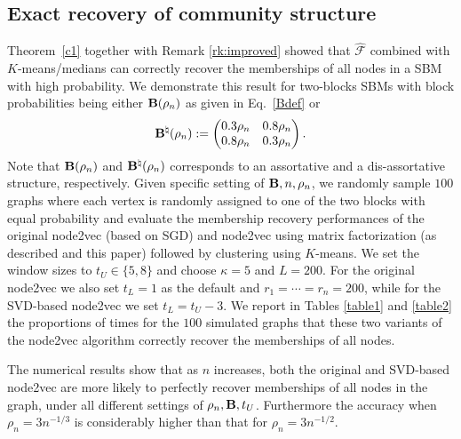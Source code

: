 \documentclass[10pt,journal,compsoc]{IEEEtran}
\newcommand{\bds}{\boldsymbol}
\newcommand{\M}[1]{{{\mathbf{\MakeUppercase{#1}}}}}
\numberwithin{equation}{section}
\begin{document}
\subsection{Exact recovery of community structure}\label{sec:erp}
Theorem~\ref{c1} together with Remark \ref{rk:improved} showed that
$\hat{\bds {\mathcal{F}}}$ combined with $K$-means/medians can correctly recover the memberships of all nodes in a SBM with high probability. We demonstrate this result for two-blocks SBMs with block probabilities being either $\M B(\rho_n)$ as given in Eq.~\eqref{Bdef} or 
\begin{equation}\nonumber
  \M B^\natural(\rho_n) := \begin{pmatrix} 0.3\rho_n  & 0.8\rho_n
\\ 0.8\rho_n  & 0.3\rho_n \end{pmatrix}.
\end{equation}
Note that $\M B(\rho_n)$ and $\M B^\natural(\rho_n)$ corresponds to 
an assortative and a dis-assortative structure, respectively. Given specific setting of $\M B, n, \rho_n$, we randomly sample $100$ graphs where each vertex is randomly assigned to one of the two blocks with equal probability and evaluate the membership recovery performances of the original node2vec \cite{grover2016node2vec} (based on SGD) and node2vec using matrix factorization (as described \cite{qiu2018network,sussman_vec,barot2021community} and this paper) followed by clustering using $K$-means. We set the window sizes to $t_U \in \{5,8\}$ and choose $\kappa = 5$ and $L = 200$. For the original node2vec we also set $t_L = 1$ as the default and $r_1 =\cdots = r_n = 200$, while for the SVD-based node2vec we set $t_L = t_U - 3$. We report in Tables \ref{table1} and \ref{table2} the proportions of times for the $100$ simulated graphs that these two variants of the node2vec algorithm correctly recover the memberships of all nodes. 
\par
The numerical results show that as $n$ increases, both the original and SVD-based node2vec are more likely to perfectly recover memberships of all nodes in the graph, under all different settings of $\rho_n,\M B,t_U$. Furthermore the accuracy when $\rho_n = 3n^{-1/3}$ is considerably higher than that for $\rho_n = 3n^{-1/2}$. %
\end{document}

